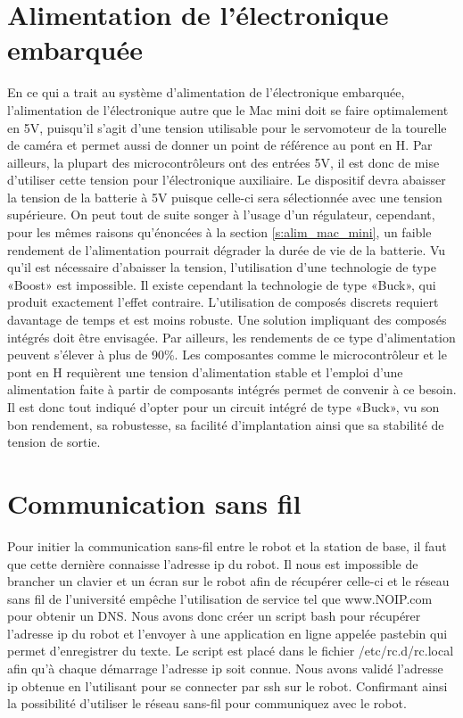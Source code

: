 \section{Alimentation de l'électronique embarquée}
En ce qui a trait au système d'alimentation de l'électronique embarquée, l'alimentation de l'électronique autre que le Mac mini doit se faire optimalement en 5V, puisqu'il s'agit d'une tension utilisable pour le servomoteur de la tourelle de caméra et permet aussi de donner un point de référence au pont en H. Par ailleurs, la plupart des microcontrôleurs ont des entrées 5V, il est donc de mise d'utiliser cette tension pour l'électronique auxiliaire. Le dispositif devra abaisser la tension de la batterie à 5V puisque celle-ci sera sélectionnée avec une tension supérieure. On peut tout de suite songer à l'usage d'un régulateur, cependant, pour les mêmes raisons qu'énoncées à la section \ref{s:alim_mac_mini}, un faible rendement de l'alimentation pourrait dégrader la durée de vie de la batterie. Vu qu'il est nécessaire d'abaisser la tension, l'utilisation d'une technologie de type «Boost» est impossible. Il existe cependant la technologie de type «Buck», qui produit exactement l'effet contraire. L'utilisation de composés discrets requiert davantage de temps et est moins robuste. Une solution impliquant des composés intégrés doit être envisagée. Par ailleurs, les rendements de ce type d'alimentation peuvent s'élever à plus de 90\%. Les composantes comme le microcontrôleur et le pont en H requièrent une tension d'alimentation stable et l'emploi d'une alimentation faite à partir de composants intégrés permet de convenir à ce besoin. Il est donc tout indiqué d'opter pour un circuit intégré de type «Buck», vu son bon rendement, sa robustesse, sa facilité d'implantation ainsi que sa stabilité de tension de sortie.

\section{Communication sans fil}\label{s:sansfil}
Pour initier la communication sans-fil entre le robot et la station de base, il faut que cette dernière connaisse l'adresse ip du robot. Il nous est impossible de brancher un clavier et un écran sur le robot afin de récupérer celle-ci et le réseau sans fil de l'université empêche l'utilisation de service tel que www.NOIP.com pour obtenir un DNS. Nous avons donc créer un script bash pour récupérer l'adresse ip du robot et l'envoyer à une application en ligne appelée pastebin qui permet d'enregistrer du texte. Le script est placé dans le fichier /etc/rc.d/rc.local afin qu'à chaque démarrage l'adresse ip soit connue. Nous avons validé l'adresse ip obtenue en l'utilisant pour se connecter par ssh sur le robot. Confirmant ainsi la possibilité d'utiliser le réseau sans-fil pour communiquez avec le robot.

